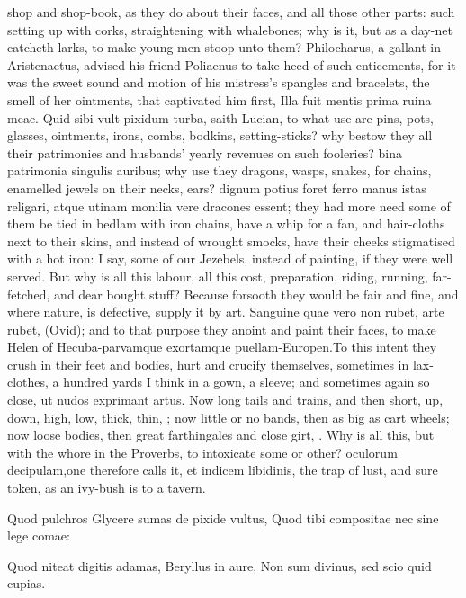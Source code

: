 {shop and shop-book, as they do about their faces, and all those other
parts: such setting up with corks, straightening with whalebones; why
is it, but as a day-net catcheth larks, to make young men stoop unto
them? Philocharus, a gallant in Aristenaetus, advised his friend
Poliaenus to take heed of such enticements, for it was the sweet
sound and motion of his mistress's spangles and bracelets, the smell of
her ointments, that captivated him first, Illa fuit mentis prima ruina
meae. Quid sibi vult pixidum turba, saith Lucian, to what use are
pins, pots, glasses, ointments, irons, combs, bodkins, setting-sticks?
why bestow they all their patrimonies and husbands' yearly revenues on
such fooleries? bina patrimonia singulis auribus; why use they
dragons, wasps, snakes, for chains, enamelled jewels on their necks,
ears? dignum potius foret ferro manus istas religari, atque utinam
monilia vere dracones essent; they had more need some of them be tied
in bedlam with iron chains, have a whip for a fan, and hair-cloths next
to their skins, and instead of wrought smocks, have their cheeks
stigmatised with a hot iron: I say, some of our Jezebels, instead of
painting, if they were well served. But why is all this labour, all
this cost, preparation, riding, running, far-fetched, and dear bought
stuff? Because forsooth they would be fair and fine, and where
nature, is defective, supply it by art. Sanguine quae vero non
rubet, arte rubet, (Ovid); and to that purpose they anoint and paint
their faces, to make Helen of Hecuba-parvamque exortamque
puellam-Europen.To this intent they crush in their feet and
bodies, hurt and crucify themselves, sometimes in lax-clothes, a
hundred yards I think in a gown, a sleeve; and sometimes again so
close, ut nudos exprimant artus. Now long tails and trains, and
then short, up, down, high, low, thick, thin, \etc{}; now little or no
bands, then as big as cart wheels; now loose bodies, then great
farthingales and close girt, \etc{}. Why is all this, but with the whore in
the Proverbs, to intoxicate some or other? oculorum decipulam,one
therefore calls it, et indicem libidinis, the trap of lust, and sure
token, as an ivy-bush is to a tavern.

Quod pulchros Glycere sumas de pixide vultus,
Quod tibi compositae nec sine lege comae:

Quod niteat digitis adamas, Beryllus in aure,
Non sum divinus, sed scio quid cupias.


}
